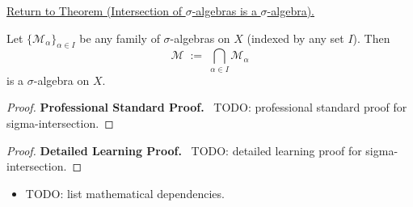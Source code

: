 \newpage
{}
\label{prf:sigma-intersection}

\begin{remark*}[Return]
\hyperref[thm:sigma-intersection]{Return to Theorem (Intersection of $\sigma$-algebras is a $\sigma$-algebra).}
\end{remark*}

\begin{theorem*}
Let $\{\mathcal{M}_\alpha\}_{\alpha \in I}$ be any family of $\sigma$-algebras
on $X$ (indexed by any set $I$). Then
\[
\mathcal{M} \;:=\; \bigcap_{\alpha \in I} \mathcal{M}_\alpha
\]
is a $\sigma$-algebra on $X$.
\end{theorem*}

\begin{proof}
\textbf{Professional Standard Proof.}~
TODO: professional standard proof for sigma-intersection.
\end{proof}

\begin{proof}
\textbf{Detailed Learning Proof.}~
TODO: detailed learning proof for sigma-intersection.
\end{proof}

\begin{remark*}
\end{remark*}

\begin{dependencies}
\begin{itemize}
  \item TODO: list mathematical dependencies.
\end{itemize}
\end{dependencies}

\clearpage
